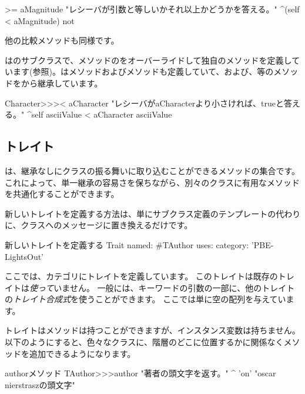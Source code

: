 \documentclass[a4paper,10pt,twoside]{book}
\begin{document}
\begin{method}[Magnitude>=]{}
>= aMagnitude 
	"レシーバが引数と等しいかそれ以上かどうかを答える。"
	^(self < aMagnitude) not
\end{method}
他の比較メソッドも同様です。

はのサブクラスで、\ct{<}メソッドのをオーバーライドして独自のメソッドを定義しています(参照)。は\ct{=}メソッドおよびメソッドも定義していて、\ct{>=}および\ct{<=}、\ct{~=}等のメソッドをから継承しています。

\begin{method}[CharacterLessThan]{}
Character>>>< aCharacter 
	"レシーバがaCharacterより小さければ、trueと答える。"
	^self asciiValue < aCharacter asciiValue
\end{method}

\subsection{トレイト}
は、継承なしにクラスの振る舞いに取り込むことができるメソッドの集合です。
これによって、単一継承の容易さを保ちながら、別々のクラスに有用なメソッドを共通化することができます。

新しいトレイトを定義する方法は、単にサブクラス定義のテンプレートの代わりに、クラスへのメッセージに置き換えるだけです。

\begin{classdef}[tauthor]{新しいトレイトを定義する}
Trait named: #TAuthor
	uses: { }
	category: 'PBE-LightsOut'
\end{classdef}

\noindent
ここでは、カテゴリにトレイトを定義しています。
このトレイトは既存のトレイトは\emph{使って}いません。
一般には、キーワードの引数の一部に、他のトレイトの\emph{トレイト合成式}を使うことができます。
ここでは単に空の配列を与えています。

トレイトはメソッドは持つことができますが、インスタンス変数は持ちません。
以下のようにすると、色々なクラスに、階層のどこに位置するかに関係なくメソッドを追加できるようになります。

\begin{method}[author]{authorメソッド}
TAuthor>>>author
    "著者の頭文字を返す。"
	^ 'on'    "oscar nierstraszの頭文字"
\end{method}
\end{document}
